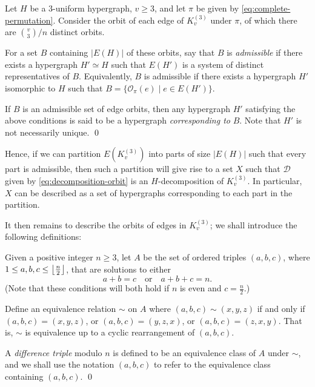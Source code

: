 \begin{definition} \label{def:admissible-orbits}
Let $H$ be a $3$-uniform hypergraph, $v \geq 3$, and let $\pi$ be given by \eqref{eq:complete-permutation}.
Consider the orbit of each edge of $K_{v}^{(3)}$ under $\pi$, of which there are ${v \choose 3}/n$ distinct orbits.

For a set $B$ containing $|E(H)|$ of these orbits, say that $B$ is {\em admissible} if there exists a hypergraph $H' \simeq H$ such that $E(H')$ is a system of distinct representatives of $B$. Equivalently, $B$ is admissible if there exists a hypergraph $H'$ isomorphic to $H$ such that $B = \{\mathcal{O}_\pi(e) \mid e \in E(H')\}$.

If $B$ is an admissible set of edge orbits, then any hypergraph $H'$ satisfying the above conditions is said to be a hypergraph {\em corresponding to} $B$. Note that $H'$ is not necessarily unique.
\qed
\end{definition}

Hence, if we can partition $E(K_{v}^{(3)})$ into parts of size $|E(H)|$ such that every part is admissible, then such a partition will give rise to a set $X$ such that $\mathcal{D}$ given by \eqref{eq:decomposition-orbit} is an $H$-decomposition of $K_{v}^{(3)}$. In particular, $X$ can be described as a set of hypergraphs corresponding to each part in the partition.

It then remains to describe the orbits of edges in $K_{v}^{(3)}$; we shall introduce the following definitions:

\begin{definition} \label{def:diff-triple}
Given a positive integer $n \geq 3$, let $A$ be the set of ordered triples $(a, b, c)$, where $1 \leq a, b, c \leq \left\lfloor \frac{n}{2} \right\rfloor$, that are solutions to either
\[
    a + b = c \quad \text{or} \quad a + b + c = n.
\]
(Note that these conditions will both hold if $n$ is even and $c = \frac{n}{2}$.)

Define an equivalence relation $\sim$ on $A$ where $(a, b, c) \sim (x, y, z)$ if and only if $(a, b, c) = (x, y, z)$, or $(a, b, c) = (y, z, x)$, or $(a, b, c) = (z, x, y)$. That is, $\sim$ is equivalence up to a cyclic rearrangement of $(a, b, c)$.

A {\em difference triple} modulo $n$ is defined to be an equivalence class of $A$ under $\sim$, and we shall use the notation $(a, b, c)$ to refer to the equivalence class containing $(a, b, c)$.
\qed
\end{definition}


